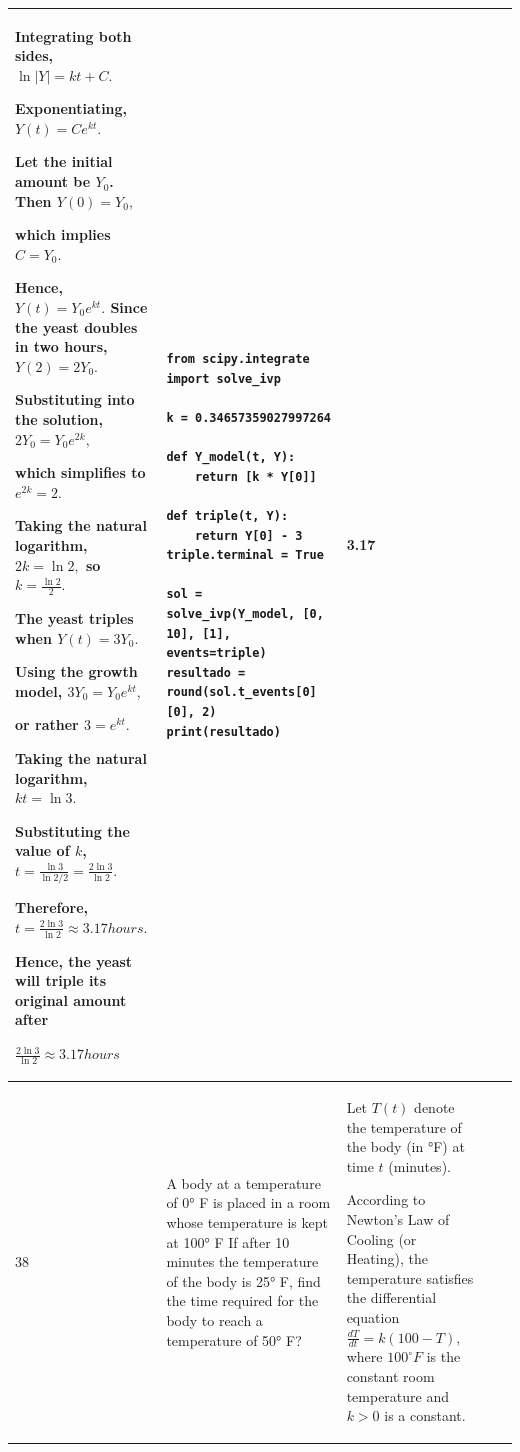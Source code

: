 \documentclass[a4paper,12pt]{article}
\begin{document}
\begin{longtable}{|p{0.3cm}|p{}|p{10cm}|p{}|p{1.5cm}|}
Integrating both sides, $\ln |Y|=kt+C.$

Exponentiating, $Y(t)=Ce^{kt}.$

Let the initial amount be $Y_0$. Then $Y(0)=Y_0,$

which implies $C=Y_0.$

Hence, $Y(t)=Y_0e^{kt}.$
Since the yeast doubles in two hours, $Y(2)=2Y_0.$

Substituting into the solution, $2Y_0=Y_0e^{2k},$

which simplifies to $e^{2k}=2.$

Taking the natural logarithm, $2k=\ln 2,$ so $k=\frac{\ln 2}{2}.$

The yeast triples when $Y(t)=3Y_0.$

Using the growth model, $3Y_0=Y_0e^{kt},$

or rather $3=e^{kt}.$

Taking the natural logarithm, $ kt=\ln 3.$

Substituting the value of $k$,
$
t=\frac{\ln 3}{\ln 2/2}
=\frac{2\ln 3}{\ln 2}.
$

Therefore, $ t=\frac{2\ln 3}{\ln 2}\approx 3.17 hours.$

Hence, the yeast will triple its original amount after

$
\frac{2\ln 3}{\ln 2}\approx 3.17hours
$


         &\begin{verbatim}
from scipy.integrate import solve_ivp

k = 0.34657359027997264  

def Y_model(t, Y):
    return [k * Y[0]]

def triple(t, Y):
    return Y[0] - 3
triple.terminal = True

sol = solve_ivp(Y_model, [0, 10], [1], events=triple)
resultado = round(sol.t_events[0][0], 2)
print(resultado)
\end{verbatim}      & 3.17        \\ \hline
    38            & A body at a temperature of 0° F is placed in a room whose temperature is kept at 100° F If after 10 minutes the temperature of the body is 25° F, find the time required for the body to reach a temperature of 50° F?
                &  Let $T(t)$ denote the temperature of the body (in °F) at time $t$ (minutes).

According to Newton's Law of Cooling (or Heating), the temperature satisfies the differential equation $
\frac{dT}{dt}=k(100-T),
$ where $100^\circ F$ is the constant room temperature and $k>0$ is a constant.


\end{longtable}
\end{document}
